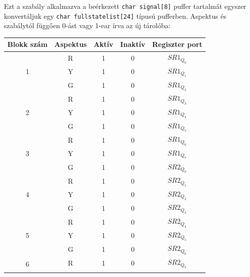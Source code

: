 \documentclass[a4paper,12pt]{article}
\begin{document}
Ezt a szabály alkalmazva a beérkezett \texttt{char signal[8]} puffer tartalmát egyszer konvertáljuk egy \texttt{char fullstatelist[24]} típusú pufferben.
Aspektus és szabálytól függően 0-ást vagy 1-ear írva az új tárolóba:

\begin{table}[htp]
\centering
\begin{tabular}{|c|c|c|c|c|}
\hline
Blokk szám         & Aspektus & Aktív & Inaktív & Regiszter port \\ \hline
\multirow{3}{*}{1} & R        & 1     & 0       &\cellcolor{blue!25} $SR1_{Q_{0}}$  \\ \cline{2-5} 
                   & Y        & 1     & 0       &\cellcolor{blue!25} $SR1_{Q_{1}}$ \\ \cline{2-5} 
                   & G        & 1     & 0       &\cellcolor{blue!25} $SR1_{Q_{2}}$  \\ \hline
\multirow{3}{*}{2} & R        & 1     & 0       &\cellcolor{blue!25} $SR1_{Q_{3}}$  \\ \cline{2-5} 
                   & Y        & 1     & 0       &\cellcolor{blue!25} $SR1_{Q_{4}}$  \\ \cline{2-5} 
                   & G        & 1     & 0       &\cellcolor{blue!25} $SR1_{Q_{5}}$  \\ \hline
\multirow{3}{*}{3} & R        & 1     & 0       &\cellcolor{blue!25} $SR1_{Q_{6}}$  \\ \cline{2-5} 
                   & Y        & 1     & 0       &\cellcolor{blue!25} $SR1_{Q_{7}}$  \\ \cline{2-5} 
                   & G        & 1     & 0       & $SR2_{Q_{0}}$  \\ \hline
\multirow{3}{*}{4} & R        & 1     & 0       & $SR2_{Q_{1}}$  \\ \cline{2-5} 
                   & Y        & 1     & 0       & $SR2_{Q_{2}}$  \\ \cline{2-5} 
                   & G        & 1     & 0       & $SR2_{Q_{3}}$  \\ \hline
\multirow{3}{*}{5} & R        & 1     & 0       & $SR2_{Q_{4}}$  \\ \cline{2-5} 
                   & Y        & 1     & 0       & $SR2_{Q_{5}}$  \\ \cline{2-5} 
                   & G        & 1     & 0       & $SR2_{Q_{6}}$  \\ \hline
\multirow{3}{*}{6} & R        & 1     & 0       & $SR2_{Q_{7}}$  \\ \cline{2-5} 

\end{tabular}
\end{table}
\end{document}
